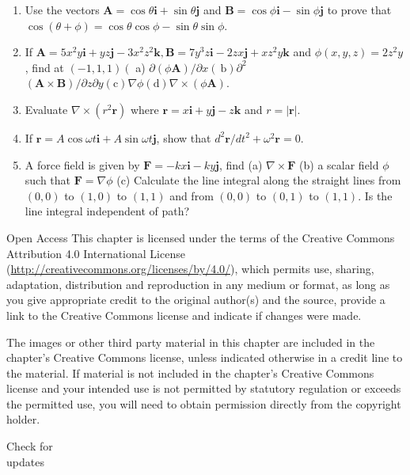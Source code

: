 \documentclass[10pt]{article}
\numberwithin{equation}{section}
\begin{document}
\begin{enumerate}
  \item Use the vectors $\mathbf{A}=\cos \theta \mathbf{i}+\sin \theta \mathbf{j}$ and $\mathbf{B}=\cos \phi \mathbf{i}-\sin \phi \mathbf{j}$ to prove that $\cos (\theta+\phi)=\cos \theta \cos \phi-\sin \theta \sin \phi$.
  \item If $\mathbf{A}=5 x^{2} y \mathbf{i}+y z \mathbf{j}-3 x^{2} z^{2} \mathbf{k}, \mathbf{B}=7 y^{3} z \mathbf{i}-2 z x \mathbf{j}+x z^{2} y \mathbf{k}$ and $\phi(x, y, z)=2 z^{2} y$, find at $(-1,1,1)\left(\right.$ a) $\partial(\phi \mathbf{A}) / \partial x(\mathrm{~b}) \partial^{2}$ $(\mathbf{A} \times \mathbf{B}) / \partial z \partial y(\mathrm{c}) \nabla \phi(\mathrm{d}) \nabla \times(\phi \mathbf{A})$.
  \item Evaluate $\nabla \times\left(r^{2} \mathbf{r}\right)$ where $\mathbf{r}=x \mathbf{i}+y \mathbf{j}-z \mathbf{k}$ and $r=|\mathbf{r}|$.
  \item If $\mathbf{r}=A \cos \omega t \mathbf{i}+A \sin \omega t \mathbf{j}$, show that $d^{2} \mathbf{r} / d t^{2}+\omega^{2} \mathbf{r}=0$.
  \item A force field is given by $\mathbf{F}=-k x \mathbf{i}-k y \mathbf{j}$, find (a) $\nabla \times \mathbf{F}$ (b) a scalar field $\phi$ such that $\mathbf{F}=\nabla \phi$ (c) Calculate the line integral along the straight lines from $(0,0)$ to $(1,0)$ to $(1,1)$ and from $(0,0)$ to $(0,1)$ to $(1,1)$. Is the line integral independent of path?
\end{enumerate}

Open Access This chapter is licensed under the terms of the Creative Commons Attribution 4.0 International License (\href{http://creativecommons.org/licenses/by/4.0/}{http://creativecommons.org/licenses/by/4.0/}), which permits use, sharing, adaptation, distribution and reproduction in any medium or format, as long as you give appropriate credit to the original author(s) and the source, provide a link to the Creative Commons license and indicate if changes were made.

The images or other third party material in this chapter are included in the chapter's Creative Commons license, unless indicated otherwise in a credit line to the material. If material is not included in the chapter's Creative Commons license and your intended use is not permitted by statutory regulation or exceeds the permitted use, you will need to obtain permission directly from the copyright holder.

Check for\\
updates
\end{document}
